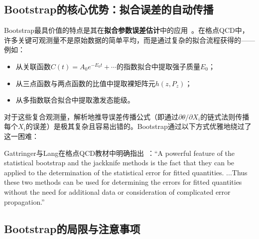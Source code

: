 \documentclass[12pt,a4paper]{ctexart}
\theoremstyle{definition}
\begin{document}
\subsection{Bootstrap的核心优势：拟合误差的自动传播}

Bootstrap最具价值的特点是其在\textbf{拟合参数误差估计}中的应用~\cite{GattringerLang2010}。在格点QCD中，许多关键可观测量不是原始数据的简单平均，而是通过复杂的拟合流程获得的——例如：
\begin{itemize}[nosep]
    \item 从关联函数$C(t) = A_0 e^{-E_0 t} + \cdots$的指数拟合中提取强子质量$E_0$；
    \item 从三点函数与两点函数的比值中提取裸矩阵元$h(z, P_z)$；
    \item 从多指数联合拟合中提取激发态能级。
\end{itemize}

对于这些复合观测量，解析地推导误差传播公式（即通过$\partial\theta/\partial X_i$的链式法则传播每个$X_i$的误差）是极其复杂且容易出错的。Bootstrap通过以下方式优雅地绕过了这一困难：

\begin{center}
\end{center}

Gattringer与Lang在格点QCD教材中明确指出~\cite{GattringerLang2010}：``A powerful feature of the statistical bootstrap and the jackknife methods is the fact that they can be applied to the determination of the statistical error for fitted quantities. ...Thus these two methods can be used for determining the errors for fitted quantities without the need for additional data or consideration of complicated error propagation.''

\subsection{Bootstrap的局限与注意事项}
\end{document}
